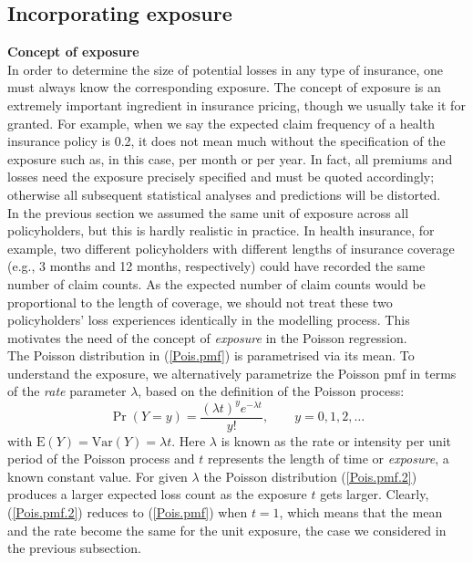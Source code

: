 \documentclass[12pt]{article}
\def\E{\mathrm{E}}
\def\Var{\mathrm{Var}}
\begin{document}
\subsection{Incorporating exposure}
\noindent\textbf{Concept of exposure\\}
In order to determine the size of potential losses in any type of insurance, one must always know the corresponding exposure. The concept of exposure is an extremely important ingredient in insurance pricing, though we usually take it for granted. For example, when we say the expected  claim frequency of a health insurance policy is 0.2, it does not mean much without the specification of the exposure such as, in this case, per month or per year. In fact, all premiums and losses need the exposure precisely specified and must be quoted accordingly; otherwise all subsequent statistical analyses and predictions will be distorted. \\

In the previous section we assumed the same unit of exposure across all policyholders, but this is hardly realistic in practice. In health insurance, for example, two different policyholders with different lengths of insurance coverage (e.g., 3 months and 12 months, respectively) could have recorded the same number of claim counts. As the expected number of claim counts would be proportional to the length of coverage, we should not treat these two policyholders' loss experiences identically in the modelling process. This motivates the need of the concept of \textit{exposure} in the Poisson regression. \\

The Poisson distribution in (\ref{Pois.pmf}) is parametrised via its mean. To understand the exposure, we alternatively parametrize the Poisson pmf in terms of the \textit{rate} parameter $\lambda$, based on the definition of the Poisson process:
\begin{equation}
\label{Pois.pmf.2}
\Pr(Y=y)=\frac{(\lambda t)^y e^{-\lambda t}}{y!},\qquad y=0,1,2, \ldots
\end{equation} with $\E(Y)=\Var(Y)=\lambda t$. Here $\lambda$ is known as the rate or intensity per unit period of the Poisson process and $t$ represents the length of time or \textit{exposure}, a known constant value. For given $\lambda$ the Poisson distribution (\ref{Pois.pmf.2}) produces a larger expected loss count  as the exposure $t$ gets larger. 
Clearly, (\ref{Pois.pmf.2}) reduces to (\ref{Pois.pmf}) when $t=1$, which means that the mean and the rate become the same for the unit  exposure, the case we considered in the previous subsection.\\
\end{document}
